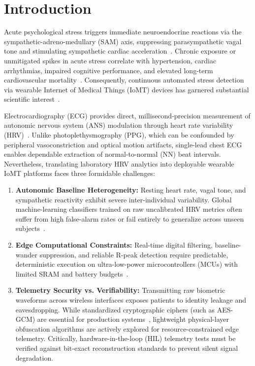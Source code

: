 \documentclass[conference]{IEEEtran}
\begin{document}
\section{Introduction}
\label{sec:introduction}
Acute psychological stress triggers immediate neuroendocrine reactions via the sympathetic-adreno-medullary (SAM) axis, suppressing parasympathetic vagal tone and stimulating sympathetic cardiac acceleration~\cite{taskforce1996hrv,kirschbaum1993trier}. Chronic exposure or unmitigated spikes in acute stress correlate with hypertension, cardiac arrhythmias, impaired cognitive performance, and elevated long-term cardiovascular mortality~\cite{healey2005detecting}. Consequently, continuous automated stress detection via wearable Internet of Medical Things (IoMT) devices has garnered substantial scientific interest~\cite{can2019continuous,garciaceja2018mental}.

Electrocardiography (ECG) provides direct, millisecond-precision measurement of autonomic nervous system (ANS) modulation through heart rate variability (HRV)~\cite{taskforce1996hrv,shaffer2017overview}. Unlike photoplethysmography (PPG), which can be confounded by peripheral vasoconstriction and optical motion artifacts, single-lead chest ECG enables dependable extraction of normal-to-normal (NN) beat intervals. Nevertheless, translating laboratory HRV analytics into deployable wearable IoMT platforms faces three formidable challenges:

\begin{enumerate}
    \item \textbf{Autonomic Baseline Heterogeneity:} Resting heart rate, vagal tone, and sympathetic reactivity exhibit severe inter-individual variability. Global machine-learning classifiers trained on raw uncalibrated HRV metrics often suffer from high false-alarm rates or fail entirely to generalize across unseen subjects~\cite{plarre2011continuous}.
    \item \textbf{Edge Computational Constraints:} Real-time digital filtering, baseline-wander suppression, and reliable R-peak detection require predictable, deterministic execution on ultra-low-power microcontrollers (MCUs) with limited SRAM and battery budgets~\cite{stmicroelectronics2020stm32g4,arm2021cmsis}.
    \item \textbf{Telemetry Security vs. Verifiability:} Transmitting raw biometric waveforms across wireless interfaces exposes patients to identity leakage and eavesdropping. While standardized cryptographic ciphers (such as AES-GCM) are essential for production systems~\cite{dworkin2007recommendation}, lightweight physical-layer obfuscation algorithms are actively explored for resource-constrained edge telemetry. Critically, hardware-in-the-loop (HIL) telemetry tests must be verified against bit-exact reconstruction standards to prevent silent signal degradation.
\end{enumerate}
\end{document}
